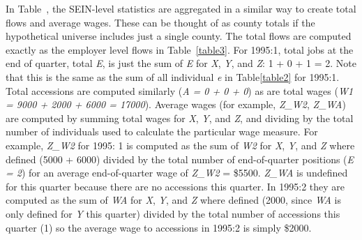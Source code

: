 

In Table~, the SEIN-level statistics are aggregated in a
similar way to create total flows and average wages. These can be thought
of as county totals if the hypothetical universe includes just a single
county. The total flows are computed exactly as the employer level flows in
Table~\ref{table3}. For 1995:1, total jobs at the end of quarter, total
\textit{E}, is just the sum of \textit{E} for \textit{X}, \textit{Y}, and
\textit{Z}: 1 + 0 + 1 = 2. Note that this is the same as the sum of all
individual \textit{e} in Table\ref{table2} for 1995:1. Total accessions are computed
similarly (\textit{A = 0 + 0 + 0}) as are total wages (\textit{W1 = 9000 +
  2000 + 6000 = 17000}).  Average wages (for example, \textit{Z\_W2},
\textit{Z\_WA}) are computed by summing total wages for \textit{X},
\textit{Y}, and \textit{Z}, and dividing by the total number of individuals
used to calculate the particular wage measure. For example, \textit{Z\_W2}
for 1995: 1 is computed as the sum of \textit{W2} for \textit{X},
\textit{Y}, and \textit{Z} where defined (5000 + 6000) divided by the total
number of end-of-quarter positions (\textit{E = 2}) for an average
end-of-quarter wage of \textit{Z\_W2} = {\$}5500. \textit{Z\_WA} is
undefined for this quarter because there are no accessions this quarter. In
1995:2 they are computed as the sum of \textit{WA} for \textit{X},
\textit{Y}, and \textit{Z} where defined (2000, since \textit{WA} is only defined
for \textit{Y} this quarter) divided by the total number of accessions this
quarter (1) so the average wage to accessions in 1995:2 is simply {\$}2000.




